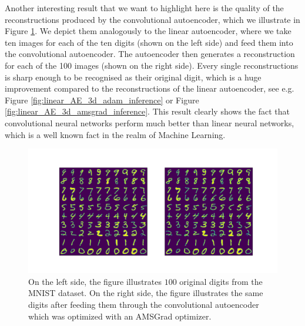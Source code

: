Another interesting result that we want to highlight here is the quality of the reconstructions produced by the convolutional autoencoder, which we illustrate in Figure \ref{fig:convolutional_AE_inference}. We depict them analogously to the linear autoencoder, where we take ten images for each of the ten digits (shown on the left side) and feed them into the convolutional autoencoder. The autoencoder then generates a reconstruction for each of the 100 images (shown on the right side). Every single reconstructions is sharp enough to be recognised as their original digit, which is a huge improvement compared to the reconstructions of the linear autoencoder, see e.g. Figure \ref{fig:linear_AE_3d_adam_inference} or Figure \ref{fig:linear_AE_3d_amsgrad_inference}. This result clearly shows the fact that convolutional neural networks perform much better than linear neural networks, which is a well known fact in the realm of Machine Learning.


\begin{figure}
\begin{center}
      \includegraphics[trim = 15mm 10mm 15mm 15mm, clip, width=\linewidth]{convolutional_AE_inference}
\end{center}
\caption{On the left side, the figure illustrates $100$ original digits from the MNIST dataset. On the right side, the figure illustrates the same digits after feeding them through the convolutional autoencoder which was optimized with an AMSGrad optimizer.}\label{fig:convolutional_AE_inference}
\end{figure}


